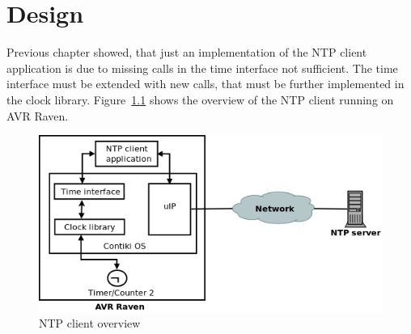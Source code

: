 
\chapter{Design}
Previous chapter showed, that just an implementation of the
NTP client application is due to missing calls in the time interface not sufficient.
The time interface must be extended with new calls,
that must be further implemented in the clock library.
Figure~\ref{fig:design-overview} shows the overview of the NTP client running on AVR Raven.

\begin{figure}[H]
  \centering
  \includegraphics[width=13cm,keepaspectratio]{fig/design.png}
  \caption{NTP client overview} %
  \label{fig:design-overview} %
\end{figure}





%


%
